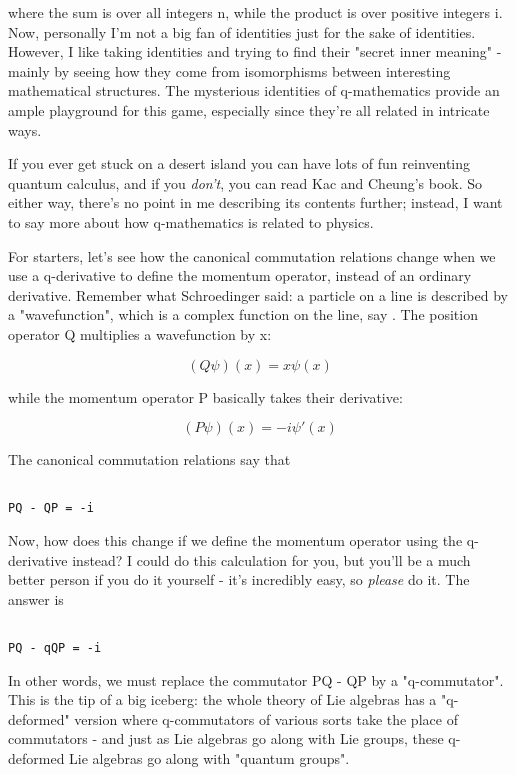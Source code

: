 where the sum is over all integers n, while the product is over positive
integers i.  Now, personally I'm not a big fan of identities just for
the sake of identities.  However, I like taking identities and trying to 
find their "secret inner meaning" - mainly by seeing how they come 
from isomorphisms between interesting mathematical structures.  The 
mysterious identities of q-mathematics provide an ample playground 
for this game, especially since they're all related in intricate ways.  

If you ever get stuck on a desert island you can have lots of fun
reinventing quantum calculus, and if you \emph{don't}, you can read Kac 
and Cheung's book.  So either way, there's no point in me describing 
its contents further; instead, I want to say more about how q-mathematics
is related to physics.

For starters, let's see how the canonical commutation relations
change when we use a q-derivative to define the momentum operator,
instead of an ordinary derivative.  Remember what Schroedinger said:
a particle on a line is described by a "wavefunction", which is a 
complex function on the line, say \psi .  The position operator Q 
multiplies a wavefunction by x:


$$

(Q \psi )(x) = x \psi (x)
$$
    
while the momentum operator P basically takes their derivative:


$$

(P \psi )(x) = -i \psi '(x)
$$
    
The canonical commutation relations say that


\begin{verbatim}

PQ - QP = -i
\end{verbatim}
    
Now, how does this change if we define the momentum operator using the
q-derivative instead?  I could do this calculation for you, but you'll
be a much better person if you do it yourself - it's incredibly easy, 
so \emph{please} do it.  The answer is


\begin{verbatim}

PQ - qQP = -i
\end{verbatim}
    

In other words, we must replace the commutator PQ - QP by a
"q-commutator".  This is the tip of a big iceberg: the whole
theory of Lie algebras has a "q-deformed" version where
q-commutators of various sorts take the place of commutators - and just
as Lie algebras go along with Lie groups, these q-deformed Lie algebras
go along with "quantum groups".

